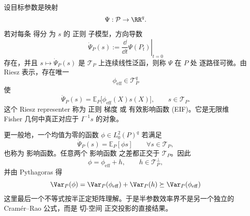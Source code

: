 \begin{definition}[逐路径可微与有效影响函数]
设目标参数是映射
\[
\Psi:\mathcal P\to\RR^q.
\]
若对每条 得分 为 $s$ 的 正则 子模型，方向导数
\[
\dot\Psi_P(s)
:=\left.\frac{\dd}{\dd t}\Psi(P_t)\right|_{t=0}
\]
存在，并且 $s\mapsto\dot\Psi_P(s)$ 是 $\mathcal T_P$ 上连续线性泛函，则称 $\Psi$ 在 $P$ 处 逐路径可微。由 Riesz 表示，存在唯一
\[
\phi_{\mathrm{eff}}
\in\mathcal T_P^q
\]
使
\begin{equation*}{
\dot\Psi_P(s)
=
\mathbb E_P\bigl[\phi_{\mathrm{eff}}(X)s(X)\bigr],
\qquad s\in\mathcal T_P.
}\end{equation*}
这个 Riesz representer 称为 正则 梯度 或 有效影响函数 (EIF)。它是无限维 Fisher 几何中真正对应于 $I^{-1}s$ 的对象。
\end{definition}

\begin{proposition}[影响函数的正交分解与效率界]
更一般地，一个均值为零的函数 $\phi\in L_0^2(P)^q$ 若满足
\[
\dot\Psi_P(s)
=
\mathbb E_P[\phi s]
\qquad\forall s\in\mathcal T_P,
\]
也称为 影响函数。任意两个 影响函数 之差都正交于 $\mathcal T_P$。因此
\[
\phi
=\phi_{\mathrm{eff}}+h,
\qquad h\in\mathcal T_P^\perp,
\]
并由 Pythagoras 得
\begin{equation}
{
\Var_P(\phi)
=
\Var_P(\phi_{\mathrm{eff}})
+\Var_P(h)
\succeq
\Var_P(\phi_{\mathrm{eff}})
}
\label{eq:math-stat-semiparametric-efficiency-bound}
\end{equation}
这里最后一个不等式按半正定矩阵理解。于是半参数效率界不是另一个独立的 Cramér--Rao 公式，而是 切-空间 正交投影的直接结果。
\end{proposition}

